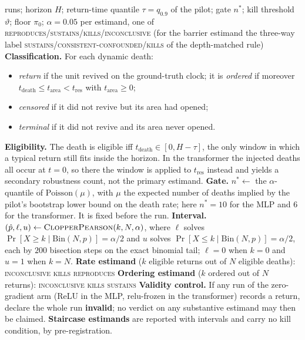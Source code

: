 \documentclass[11pt]{article}
\theoremstyle{definition}
\theoremstyle{remark}
\begin{document}
\begin{algorithm}[h]
\caption{Pre-registered decision procedure}
\label{alg:decisao}
\begin{algorithmic}[1]
\REQUIRE runs; horizon $H$; return-time quantile $\tau=q_{0.9}$ of the pilot;
gate $n^\ast$; kill threshold $\vartheta$; floor $\pi_0$; $\alpha=0.05$
\ENSURE per estimand, one of
\textsc{reproduces}/\textsc{sustains}/\textsc{kills}/\textsc{inconclusive}
(for the barrier estimand the three-way label
\textsc{sustains}/\textsc{consistent-confounded}/\textsc{kills} of the
depth-matched rule)
\STATE \textbf{Classification.} For each dynamic death:
\begin{itemize}\itemsep0pt
\item \emph{return} if the unit revived on the ground-truth clock; it is
\emph{ordered} if moreover $t_{\mathrm{death}}\le t_{\mathrm{area}}<t_{\mathrm{res}}$
with $t_{\mathrm{area}}\ge0$;
\item \emph{censored} if it did not revive but its area had opened;
\item \emph{terminal} if it did not revive and its area never opened.
\end{itemize}
\STATE \textbf{Eligibility.} The death is eligible iff
$t_{\mathrm{death}}\in[0,H-\tau]$, the only window in which a typical return
still fits inside the horizon. In the transformer the injected deaths all occur
at $t=0$, so there the window is applied to $t_{\mathrm{res}}$ instead and yields
a secondary robustness count, not the primary estimand.
\STATE \textbf{Gate.} $n^\ast\leftarrow$ the $\alpha$-quantile of
$\mathrm{Poisson}(\mu)$, with $\mu$ the expected number of deaths implied by the
pilot's bootstrap lower bound on the death rate; here $n^\ast=10$ for the MLP and
$6$ for the transformer. It is fixed before the run.
\STATE \textbf{Interval.} $(\hat p,\ell,u)\leftarrow\textsc{ClopperPearson}(k,N,\alpha)$,
where $\ell$ solves $\Pr[X\ge k\mid\mathrm{Bin}(N,p)]=\alpha/2$ and $u$ solves
$\Pr[X\le k\mid\mathrm{Bin}(N,p)]=\alpha/2$, each by $200$ bisection steps on the
exact binomial tail; $\ell=0$ when $k=0$ and $u=1$ when $k=N$.
\STATE \textbf{Rate estimand} ($k$ eligible returns out of $N$ eligible deaths):
  \RETURN \textsc{inconclusive} 
  \RETURN \textsc{kills}
\ELSE
  \RETURN \textsc{reproduces}
\ENDIF
\STATE \textbf{Ordering estimand} ($k$ ordered out of $N$ returns):
 \RETURN \textsc{inconclusive}
 \RETURN \textsc{kills}
\ELSE \RETURN \textsc{sustains}
\ENDIF
\STATE \textbf{Validity control.} If any run of the zero-gradient arm (ReLU in
the MLP, relu-frozen in the transformer) records a return, declare the whole run
\textbf{invalid}; no verdict on any substantive estimand may then be claimed.
\STATE \textbf{Staircase estimands} are reported with intervals and carry no kill
condition, by pre-registration.
\end{algorithmic}
\end{algorithm}
\end{document}
